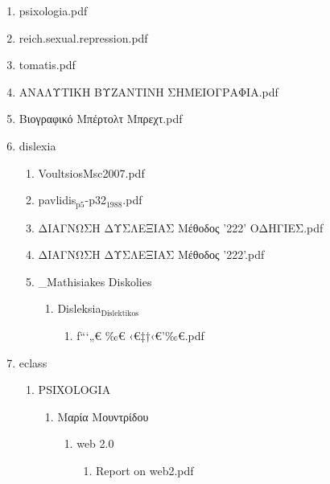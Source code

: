 \documentclass[11pt]{article}
\begin{document}
\begin{enumerate}
\begin{enumerate}
\item psixologia.pdf
\label{sec-1-1-1-1-49-2-2-1-58}

\item reich.sexual.repression.pdf
\label{sec-1-1-1-1-49-2-2-1-59}

\item tomatis.pdf
\label{sec-1-1-1-1-49-2-2-1-60}

\item ΑΝΑΛΥΤΙΚΗ ΒΥΖΑΝΤΙΝΗ ΣΗΜΕΙΟΓΡΑΦΙΑ.pdf
\label{sec-1-1-1-1-49-2-2-1-61}

\item Βιογραφικό Μπέρτολτ Μπρεχτ.pdf
\label{sec-1-1-1-1-49-2-2-1-62}

\item dislexia
\label{sec-1-1-1-1-49-2-2-1-63}
\begin{enumerate}
\item VoultsiosMsc2007.pdf
\label{sec-1-1-1-1-49-2-2-1-63-1}

\item pavlidis$_{\text{p5}}$-p32$_{\text{1988}}$.pdf
\label{sec-1-1-1-1-49-2-2-1-63-2}

\item ΔΙΑΓΝΩΣΗ ΔΥΣΛΕΞΙΑΣ Μέθοδος '222' ΟΔΗΓΙΕΣ.pdf
\label{sec-1-1-1-1-49-2-2-1-63-3}

\item ΔΙΑΓΝΩΣΗ ΔΥΣΛΕΞΙΑΣ Μέθοδος '222'.pdf
\label{sec-1-1-1-1-49-2-2-1-63-4}

\item \_Mathisiakes Diskolies
\label{sec-1-1-1-1-49-2-2-1-63-5}
\begin{enumerate}
\item Disleksia$_{\text{Dislektikos}}$
\label{sec-1-1-1-1-49-2-2-1-63-5-1}
\begin{enumerate}
\item ƒ“‘„€ ‰€ ‹€‡†‹€’‰€.pdf
\label{sec-1-1-1-1-49-2-2-1-63-5-1-1}
\end{enumerate}
\end{enumerate}
\end{enumerate}

\item eclass
\label{sec-1-1-1-1-49-2-2-1-64}
\begin{enumerate}
\item PSIXOLOGIA
\label{sec-1-1-1-1-49-2-2-1-64-1}
\begin{enumerate}
\item Μαρία Μουντρίδου
\label{sec-1-1-1-1-49-2-2-1-64-1-1}
\begin{enumerate}
\item web 2.0
\label{sec-1-1-1-1-49-2-2-1-64-1-1-1}
\begin{enumerate}
\item Report on web2.pdf
\label{sec-1-1-1-1-49-2-2-1-64-1-1-1-1}


\end{enumerate}
\end{enumerate}
\end{enumerate}
\end{enumerate}
\end{enumerate}
\end{enumerate}
\end{document}

